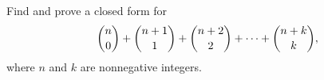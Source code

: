 Find and prove a closed form for
\[\dbinom n0+\dbinom{n+1}{1}+\dbinom{n+2}{2}+\cdots+\dbinom{n+k}{k},\]
where $n$ and $k$ are nonnegative integers.
